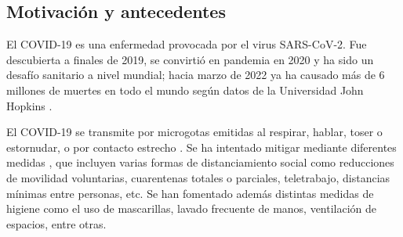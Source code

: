 \begin{intro}





\section*{Motivación y antecedentes}

El COVID-19 es una enfermedad provocada por el virus SARS-CoV-2. Fue descubierta a finales de 2019, se convirtió en pandemia en 2020 y ha sido un desafío sanitario a nivel mundial; hacia marzo de 2022 ya ha causado más de 6 millones de muertes en todo el mundo según datos de la Universidad John Hopkins \cite{Dong2020}. %

El COVID-19 se transmite por microgotas emitidas al respirar, hablar, toser o estornudar, o por contacto estrecho \cite{Dong2020}\cite{Greenhalgh2021}. Se ha intentado mitigar mediante diferentes medidas \cite{Flaxman2020}\cite{Castillo-Laborde2021}, que incluyen varias formas de distanciamiento social como reducciones de movilidad voluntarias, cuarentenas totales o parciales, teletrabajo, distancias mínimas entre personas, etc. Se han fomentado además distintas medidas de higiene como el uso de mascarillas, lavado frecuente de manos, ventilación de espacios, entre otras.


\end{intro}

